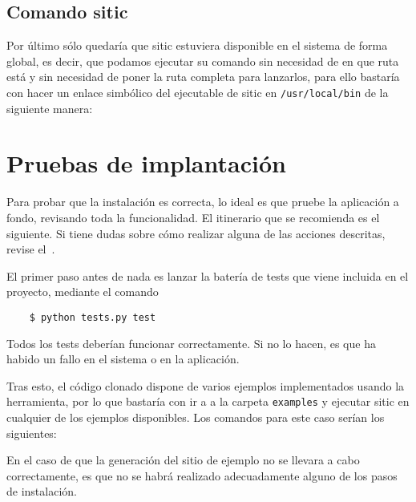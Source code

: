 \subsection{Comando sitic}

Por último sólo quedaría que sitic estuviera disponible en el sistema de forma global, es decir,
que podamos ejecutar su comando sin necesidad de en que ruta está y sin necesidad de poner la ruta completa
para lanzarlos, para ello bastaría con hacer un enlace simbólico del ejecutable de sitic en
\texttt{/usr/local/bin} de la siguiente manera:


\section{Pruebas de implantación}

Para probar que la instalación es correcta, lo ideal es que pruebe la aplicación
a fondo, revisando toda la funcionalidad. El itinerario que se recomienda es el
siguiente. Si tiene dudas sobre cómo realizar alguna de las acciones descritas,
revise el~.

El primer paso antes de nada es lanzar la batería de tests que viene incluida en
el proyecto, mediante el comando

\begin{verbatim}
    $ python tests.py test
\end{verbatim}

Todos los tests deberían funcionar correctamente. Si no lo hacen, es que ha
habido un fallo en el sistema o en la aplicación.

Tras esto, el código clonado dispone de varios ejemplos implementados usando la herramienta,
por lo que bastaría con ir a a la carpeta \texttt{examples} y ejecutar sitic en cualquier
de los ejemplos disponibles. Los comandos para este caso serían los siguientes:


En el caso de que la generación del sitio de ejemplo no se llevara a cabo
correctamente, es que no se habrá realizado adecuadamente alguno de los pasos de instalación.
